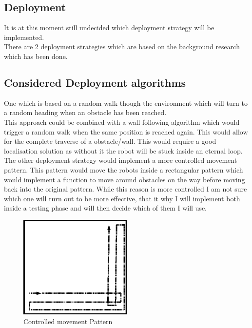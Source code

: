 \begin{flushleft}
\section{Deployment}
It is at this moment still undecided which deployment strategy will be implemented. \\
There are 2 deployment strategies which are based on the background research which has been done.\\[3ex]

\subsection{Considered Deployment algorithms}

One which is based on a random walk though the environment which will turn to a random heading when an obstacle has been reached. \\
This approach could be combined with a wall following algorithm which would trigger a random walk when the same position is reached again. This would allow for the complete traverse of a obstacle/wall. This would require a good localisation solution as without it the robot will be stuck inside an eternal loop.\\[3ex]

The other deployment strategy would implement a more controlled movement pattern. This pattern would move the robots inside a rectangular pattern which would implement a function to move around obstacles on the way before moving back into the original pattern. 
While this reason is more controlled I am not sure which one will turn out to be more effective, that it why I will implement both inside a testing phase and will then decide which of them I will use.

\begin{figure}[h]
\centering
\includegraphics[width=0.5\textwidth]{../../figures/movement_pattern.png} 
\caption{Controlled movement Pattern}
\label{Figure 3}
\end{figure}


\end{flushleft}
